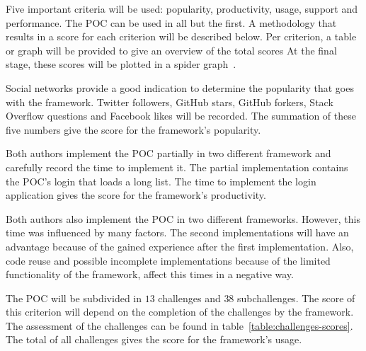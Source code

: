 \documentclass[a4paper]{artikel3}
\newcommand{\setspace}[0]{\vspace{2mm}}
\renewcommand{\paragraph}[1]{\setspace \noindent {\bf #1}  }
\begin{document}
Five important criteria will be used:  popularity,  productivity,  usage,  support and performance. 
The POC can be used in all but the first.   
A methodology that results in a score for each criterion will be described below.  
Per criterion,  a table or graph will be provided to give an overview of the total scores
At the final stage,  these scores will be plotted in a spider graph~\cite{Few2005}.   

\paragraph{Popularity}
Social networks provide a good indication to determine the popularity that goes with the framework.  
Twitter followers,  GitHub stars,  GitHub forkers,  Stack Overflow questions and Facebook likes will be recorded.
The summation of these five numbers give the score for the framework's popularity.  


\paragraph{Productivity}
Both authors implement the POC partially in two different framework and carefully record the time to implement it. 
The partial implementation contains the POC's login that loads a long list.
The time to implement the login application gives the score for the framework's productivity. 

Both authors also implement the POC in two different frameworks.
However,  this time was influenced by many factors.
The second implementations will have an advantage because of the gained experience after the first implementation.
Also,  code reuse and possible incomplete implementations because of the limited functionality of the framework, affect this times in a negative way.


\paragraph{Usage}
The POC will be subdivided in $13$ challenges and $38$ subchallenges.  
The score of this criterion will depend on the completion of the challenges by the framework.  
The assessment of the challenges can be found in table~\ref{table:challenges-scores}.  
The total of all challenges gives the score for the framework's usage.
\end{document}
